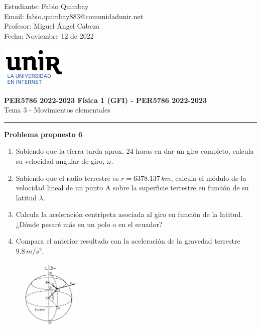 \documentclass[11pt,letterpaper]{article}
\begin{document}
\pagestyle{plain}

\begin{flushleft}
Estudiante: Fabio Quimbay\\
Email: fabio.quimbay883@comunidadunir.net\\
Profesor: Miguel Ángel Cabeza\\
Fecha: Noviembre 12 de 2022\\
\end{flushleft}

\begin{flushright}\vspace{-20mm}
\includegraphics[height=2cm]{logo.png}
\end{flushright}
 
\begin{center}\vspace{0cm}
\textbf{\large PER5786 2022-2023  Física 1 (GFI) - PER5786 2022-2023}\\
 Tema 3 - Movimientos elementales
\end{center}

 
\rule{\linewidth}{0.1mm}

\bigskip
\bigskip

\textbf{Problema propuesto 6}\\

\begin{enumerate}
  \item Sabiendo que la tierra tarda aprox. 24 horas en dar un giro completo, calcula su velocidad angular de giro, $\omega$.
  \item Sabiendo que el radio terrestre es $r = 6378.137\,km$, calcula el módulo de la velocidad lineal  de un punto A sobre la superficie terrestre en función de su latitud $\lambda$.
  \item Calcula la aceleración centrípeta  asociada al giro en función de la latitud. ¿Dónde pesaré más en un polo o en el ecuador?
  \item Compara el anterior resultado con la aceleración de la gravedad terrestre $9.8\,m/s^2$.
\end{enumerate}

\begin{figure}
\begin{center}
\includegraphics[width=0.25\textwidth]{problema_6.png}
\end{center}
\end{figure}
\end{document}
